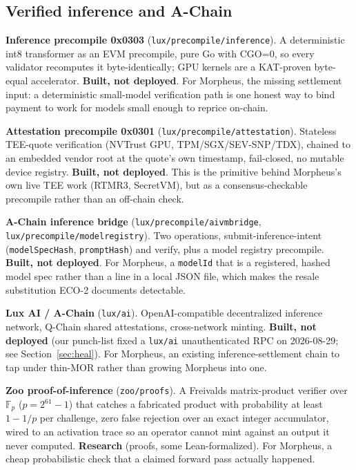 \documentclass[11pt,a4paper]{article}
\newcommand{\code}[1]{\texttt{\small #1}}
\begin{document}
\subsection{Verified inference and A-Chain}

\textbf{Inference precompile 0x0303} (\code{lux/precompile/inference}). A deterministic int8
transformer as an EVM precompile, pure Go with CGO=0, so every validator recomputes it
byte-identically; GPU kernels are a KAT-proven byte-equal accelerator. \textbf{Built, not
deployed}. For Morpheus, the missing settlement input: a deterministic small-model verification
path is one honest way to bind payment to work for models small enough to reprice on-chain.

\textbf{Attestation precompile 0x0301} (\code{lux/precompile/attestation}). Stateless TEE-quote
verification (NVTrust GPU, TPM/SGX/SEV-SNP/TDX), chained to an embedded vendor root at the
quote's own timestamp, fail-closed, no mutable device registry. \textbf{Built, not deployed}.
This is the primitive behind Morpheus's own live TEE work (RTMR3, SecretVM), but as a
consensus-checkable precompile rather than an off-chain check.

\textbf{A-Chain inference bridge} (\code{lux/precompile/aivmbridge},
\code{lux/precompile/modelregistry}). Two operations, submit-inference-intent
(\code{modelSpecHash}, \code{promptHash}) and verify, plus a model registry precompile.
\textbf{Built, not deployed}. For Morpheus, a \code{modelId} that is a registered, hashed model
spec rather than a line in a local JSON file, which makes the resale substitution ECO-2
documents detectable.

\textbf{Lux AI / A-Chain} (\code{lux/ai}). OpenAI-compatible decentralized inference network,
Q-Chain shared attestations, cross-network minting. \textbf{Built, not deployed} (our
punch-list fixed a \code{lux/ai} unauthenticated RPC on 2026-08-29; see
Section~\ref{sec:heal}). For Morpheus, an existing inference-settlement chain to tap under
thin-MOR rather than growing Morpheus into one.

\textbf{Zoo proof-of-inference} (\code{zoo/proofs}). A Freivalds matrix-product verifier over
$\mathbb{F}_p$ ($p = 2^{61}-1$) that catches a fabricated product with probability at least
$1 - 1/p$ per challenge, zero false rejection over an exact integer accumulator, wired to an
activation trace so an operator cannot mint against an output it never computed.
\textbf{Research} (proofs, some Lean-formalized). For Morpheus, a cheap probabilistic check that
a claimed forward pass actually happened.
\end{document}
